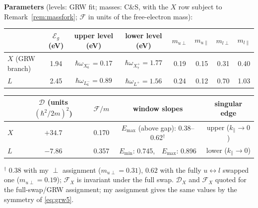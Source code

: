 \documentclass[11pt,a4paper]{article}
\numberwithin{equation}{section}
\newcommand{\cD}{\mathcal{D}}
\newcommand{\cF}{\mathcal{F}}
\newcommand{\kpar}{k_{\parallel}}
\newcommand{\wXsix}{\hbar\omega_{X_6^-}}
\newcommand{\wXseven}{\hbar\omega_{X_7^+}}
\newcommand{\wLsix}{\hbar\omega_{L_6^-}}
\newcommand{\wLplus}{\hbar\omega_{L^+}}
\begin{document}
\medskip
\noindent\textbf{Parameters} (levels: GRW fit; masses: C\&S, with the
$X$ row subject to Remark~\ref{rem:massfork}; $\cF$ in units of the
free-electron mass):
\begin{center}
\begin{tabular}{lccccccc}
\toprule
 & $\mathcal{E}_g$ (eV) & upper level (eV) & lower level (eV)
 & $m_{u\perp}$ & $m_{u\parallel}$ & $m_{l\perp}$ & $m_{l\parallel}$\\
\midrule
$X$ (GRW branch) & 1.94 & $\wXsix=0.17$ & $\wXseven=1.77$
 & 0.19 & 0.15 & 0.31 & 0.40\\
$L$ & 2.45 & $\wLsix=0.89$ & $\wLplus=1.56$
 & 0.24 & 0.12 & 0.70 & 1.03\\
\bottomrule
\end{tabular}

\medskip
\begin{tabular}{lcccc}
\toprule
 & $\cD$ (units $(\hbar^2/2m)^2$) & $\cF/m$ & window slopes & singular edge\\
\midrule
$X$ & $+34.7$ & 0.170 & $E_{\max}$ (above gap): 0.38--0.62$^{\dagger}$
 & upper ($\kpar\to0$)\\
$L$ & $-7.86$ & 0.357 & $E_{\min}$: 0.745,\ \ $E_{\max}$: 0.896
 & lower ($\kpar\to0$)\\
\bottomrule
\end{tabular}
\end{center}
{\footnotesize $^{\dagger}$ $0.38$ with my $\perp$ assignment
($m_{u\perp}=0.31$), $0.62$ with the fully $u\leftrightarrow l$
swapped one ($m_{u\perp}=0.19$); $\cF_X$ is invariant under the full
swap. $\cD_X$ and $\cF_X$ quoted for the full-swap/GRW assignment;
my assignment gives the same values by the symmetry of
\eqref{eq:grw5}.}
\end{document}
